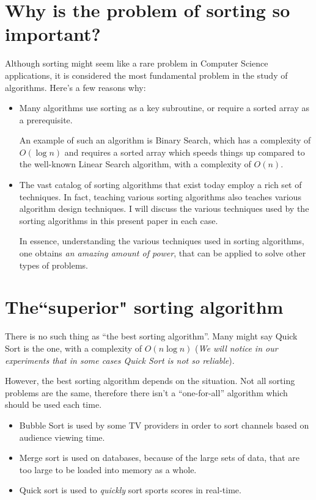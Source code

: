 \documentclass[a4paper]{article}
\begin{document}
    \section{Why is the problem of sorting so important?}
        Although sorting might seem like a rare problem in Computer Science applications, it is considered the most fundamental problem in the study of algorithms. Here's a few reasons why:
        \begin{itemize}
            \item Many algorithms use sorting as a key subroutine, 
                or require a sorted array as a prerequisite. 
                
                An example of such an algorithm is Binary Search, which has a complexity of $O(\log n)$
                and requires a sorted array which speeds things up compared to the well-known Linear Search 
                algorithm, with a complexity of $O(n)$.
            \item The vast catalog of sorting algorithms that exist 
            today employ a rich set of techniques. 
            In fact, teaching various sorting algorithms also teaches 
            various algorithm design techniques. 
            I will discuss the various techniques used by the sorting algorithms 
            in this present paper in each case. 
            
            In essence, understanding the various techniques used in sorting algorithms, 
            one obtains \textit{an amazing amount of power}, 
            that can be applied to solve other types of problems.
        \end{itemize}

    \section{The``superior" sorting algorithm}
        There is no such thing as “the best sorting algorithm”. 
        Many might say Quick Sort is the one, with a complexity of $O(n\log n)$
        (\textit{We will notice in our experiments that in some cases Quick Sort is not so reliable}).
        
        \noindent However, the best sorting algorithm depends on the situation. 
        Not all sorting problems are the same, therefore there isn't a “one-for-all” algorithm 
        which should be used each time.

        \begin{itemize}
            \item Bubble Sort is used by some TV providers 
                in order to sort channels based on audience viewing time.
            \item Merge sort is used on databases, because of the large sets of data, 
                that are too large to be loaded into memory as a whole.
            \item Quick sort is used to \textit{quickly} sort sports scores in real-time.
        \end{itemize}
        
\end{document}
